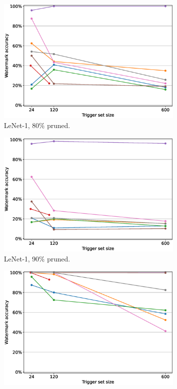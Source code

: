 \begin{figure}
\begin{subfigure}{0.4\linewidth}
        \includegraphics[width=\linewidth]{images/pruning/lenet1_pruning_per_arch_08.eps}
        \caption{LeNet-1, 80\% pruned.}
        \label{fig:pruning-0.8-lenet1}
    \end{subfigure}
    \quad
    \begin{subfigure}{0.4\linewidth}
        \includegraphics[width=\linewidth]{images/pruning/lenet1_pruning_per_arch_09.eps}
        \caption{LeNet-1, 90\% pruned.}
        \label{fig:pruning-0.9-lenet1}
    \end{subfigure}
    \quad
    \begin{subfigure}{0.4\linewidth}
        \includegraphics[width=\linewidth]{images/pruning/lenet3_pruning_per_arch_08.eps}

\end{subfigure}
\end{figure}
